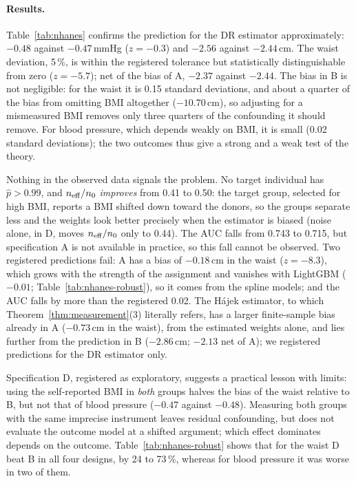 \paragraph{Results.} Table~\ref{tab:nhanes} confirms the prediction for the DR estimator approximately: $-0.48$ against $-0.47$\,mmHg ($z=-0.3$) and $-2.56$ against $-2.44$\,cm. The waist deviation, 5\,\%, is within the registered tolerance but statistically distinguishable from zero ($z=-5.7$); net of the bias of A, $-2.37$ against $-2.44$. The bias in B is not negligible: for the waist it is 0.15 standard deviations, and about a quarter of the bias from omitting BMI altogether ($-10.70$\,cm), so adjusting for a mismeasured BMI removes only three quarters of the confounding it should remove. For blood pressure, which depends weakly on BMI, it is small (0.02 standard deviations); the two outcomes thus give a strong and a weak test of the theory.

Nothing in the observed data signals the problem. No target individual has $\hat p>0.99$, and $n_{\mathrm{eff}}/n_0$ \emph{improves} from 0.41 to 0.50: the target group, selected for high BMI, reports a BMI shifted down toward the donors, so the groups separate less and the weights look better precisely when the estimator is biased (noise alone, in D, moves $n_{\mathrm{eff}}/n_0$ only to 0.44). The AUC falls from 0.743 to 0.715, but specification A is not available in practice, so this fall cannot be observed. Two registered predictions fail: A has a bias of $-0.18$\,cm in the waist ($z=-8.3$), which grows with the strength of the assignment and vanishes with LightGBM ($-0.01$; Table~\ref{tab:nhanes-robust}), so it comes from the spline models; and the AUC falls by more than the registered 0.02. The H\'ajek estimator, to which Theorem~\ref{thm:measurement}(3) literally refers, has a larger finite-sample bias already in A ($-0.73$\,cm in the waist), from the estimated weights alone, and lies further from the prediction in B ($-2.86$\,cm; $-2.13$ net of A); we registered predictions for the DR estimator only.

Specification D, registered as exploratory, suggests a practical lesson with limits: using the self-reported BMI in \emph{both} groups halves the bias of the waist relative to B, but not that of blood pressure ($-0.47$ against $-0.48$). Measuring both groups with the same imprecise instrument leaves residual confounding, but does not evaluate the outcome model at a shifted argument; which effect dominates depends on the outcome. Table~\ref{tab:nhanes-robust} shows that for the waist D beat B in all four designs, by 24 to 73\,\%, whereas for blood pressure it was worse in two of them.

